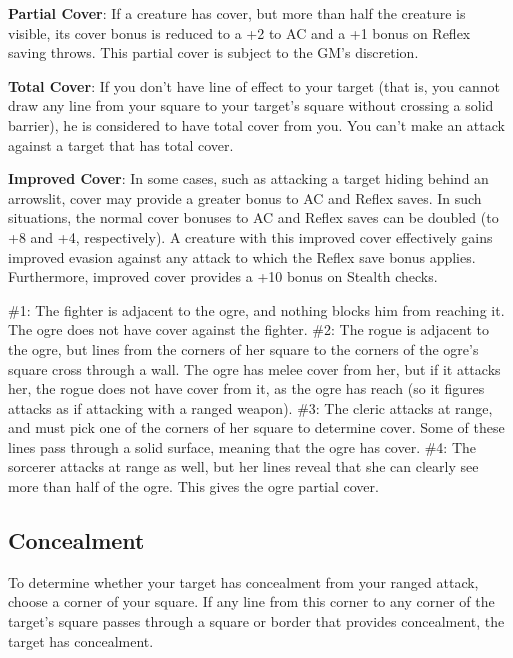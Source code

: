 \textbf{Partial Cover}: If a creature has cover, but more than half the creature is visible, its cover bonus is reduced to a +2 to AC and a +1 bonus on Reflex saving throws. This partial cover is subject to the GM's discretion.
				
\textbf{Total Cover}: If you don't have line of effect to your target (that is, you cannot draw any line from your square to your target's square without crossing a solid barrier), he is considered to have total cover from you. You can't make an attack against a target that has total cover.
				
\textbf{Improved Cover}: In some cases, such as attacking a target hiding behind an arrowslit, cover may provide a greater bonus to AC and Reflex saves. In such situations, the normal cover bonuses to AC and Reflex saves can be doubled (to +8 and +4, respectively). A creature with this improved cover effectively gains improved evasion against any attack to which the Reflex save bonus applies. Furthermore, improved cover provides a +10 bonus on Stealth checks.

\#1: The fighter is adjacent to the ogre, and nothing blocks him from reaching it. The ogre does not have cover against the fighter.\newline
\#2: The rogue is adjacent to the ogre, but lines from the corners of her square to the corners of the ogre's square cross through a wall. The ogre has melee cover from her, but if it attacks her, the rogue does not have cover from it, as the ogre has reach (so it figures attacks as if attacking with a ranged weapon).\newline
\#3: The cleric attacks at range, and must pick one of the corners of her square to determine cover. Some of these lines pass through a solid surface, meaning that the ogre has cover.\newline
\#4: The sorcerer attacks at range as well, but her lines reveal that she can clearly see more than half of the ogre. This gives the ogre partial cover.


				
\subsection{Concealment}

				
To determine whether your target has concealment from your ranged attack, choose a corner of your square. If any line from this corner to any corner of the target's square passes through a square or border that provides concealment, the target has concealment.
				
